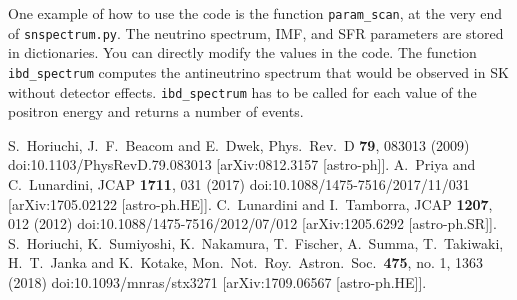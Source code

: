 \documentclass[12pt]{article}
\begin{document}
    One example of how to use the code is the function \texttt{param\_scan}, at the very end of \texttt{snspectrum.py}. The neutrino spectrum, IMF, and SFR parameters are stored in dictionaries. You can directly modify the values in the code. The function \texttt{ibd\_spectrum} computes the antineutrino spectrum that would be observed in SK without detector effects. \texttt{ibd\_spectrum} has to be called for each value of the positron energy and returns a number of events.
    \begin{thebibliography}{}
          S.~Horiuchi, J.~F.~Beacom and E.~Dwek,
          Phys.\ Rev.\ D {\bf 79}, 083013 (2009)
          doi:10.1103/PhysRevD.79.083013
          [arXiv:0812.3157 [astro-ph]].
          A.~Priya and C.~Lunardini,
          JCAP {\bf 1711}, 031 (2017)
          doi:10.1088/1475-7516/2017/11/031
          [arXiv:1705.02122 [astro-ph.HE]].
          C.~Lunardini and I.~Tamborra,
          JCAP {\bf 1207}, 012 (2012)
          doi:10.1088/1475-7516/2012/07/012
          [arXiv:1205.6292 [astro-ph.SR]].
          S.~Horiuchi, K.~Sumiyoshi, K.~Nakamura, T.~Fischer, A.~Summa, T.~Takiwaki, H.~T.~Janka and K.~Kotake,
          Mon.\ Not.\ Roy.\ Astron.\ Soc.\  {\bf 475}, no. 1, 1363 (2018)
          doi:10.1093/mnras/stx3271
          [arXiv:1709.06567 [astro-ph.HE]].
    \end{thebibliography}
\end{document}
